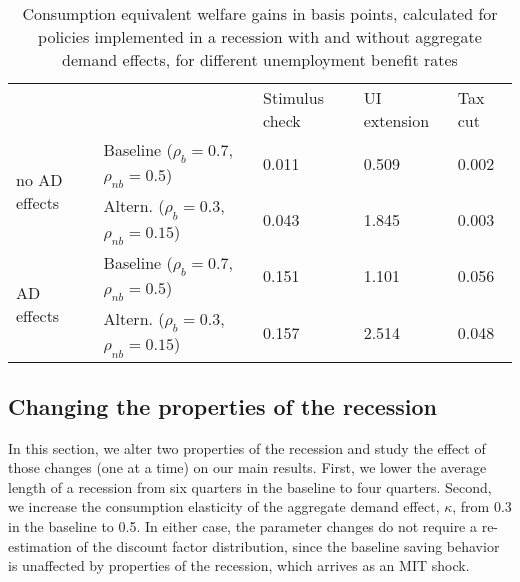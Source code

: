 \documentclass[\latexroot/\projectname]{subfiles}
\begin{document}
\begin{table}[htbp]
  \begin{center}
    \begin{tabular}
      {@{}lllll@{}}
      \toprule
                                     &                                                     & Stimulus check & UI extension & Tax cut \\ \cmidrule(l){1-5}
      \multirow{2}{*}{no AD effects} & Baseline  ($\rho_{b}\!=\!0.7$, $\rho_{nb}\!=\!0.5$) & 0.011          & 0.509        & 0.002   \\
                                     & Altern.  ($\rho_{b}\!=\!0.3$, $\rho_{nb}\!=\!0.15$) & 0.043          & 1.845        & 0.003   \\ \cmidrule(l){1-5}
      \multirow{2}{*}{AD effects}    & Baseline  ($\rho_{b}\!=\!0.7$, $\rho_{nb}\!=\!0.5$) & 0.151          & 1.101        & 0.056   \\
                                     & Altern.  ($\rho_{b}\!=\!0.3$, $\rho_{nb}\!=\!0.15$) & 0.157          & 2.514        & 0.048   \\ \cmidrule(l){1-5}
    \end{tabular}
    \caption{Consumption equivalent welfare gains in basis points, calculated for policies implemented in a recession with and without aggregate demand effects, for different unemployment benefit rates}
    \whenintegrated{\label{tab:robustness_benefit_results}} 
  \end{center}
\end{table}

\FloatBarrier
\hypertarget{changing-the-properties-of-the-recession}{}\par\subsection*{Changing the properties of the recession}

In this section, we alter two properties of the recession and study the effect of those changes (one at a time) on our main results.
First, we lower the average length of a recession from six quarters in the baseline to four quarters.
Second, we increase the consumption elasticity of the aggregate demand effect, $\kappa$, from 0.3 in the baseline to 0.5.
In either case, the parameter changes do not require a re-estimation of the discount factor distribution, since the baseline saving behavior is unaffected by properties of the recession, which arrives as an MIT shock.
\end{document}
